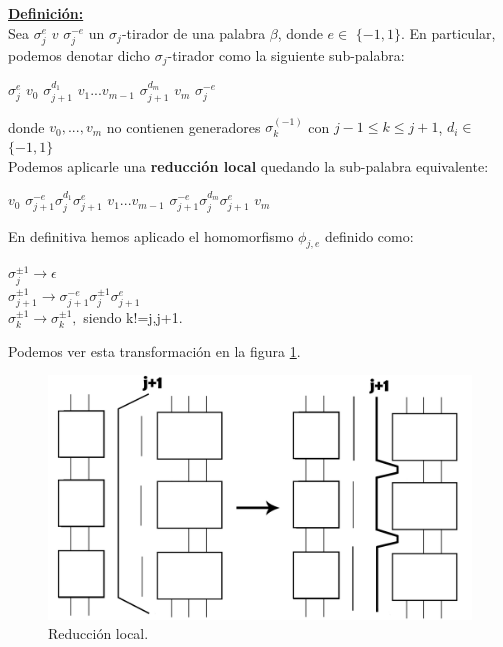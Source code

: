 \underline{\textbf{ Definición:}}\\
Sea $\sigma_{j}^{e}$ $v$ $\sigma_{j}^{-e} $ un $\sigma_{j}$-tirador de una palabra $\beta$, donde $e \in$ $ \{-1,1\} $. En particular, podemos denotar dicho $\sigma_{j}$-tirador como la siguiente sub-palabra:
\begin{center}
	$ \sigma_{j}^{e} $ $ v_{0} $ $\sigma_{j+1}^{d_{1}} $ $ v_{1}...v_{m-1} $ $\sigma_{j+1}^{d_{m}} $ $ v_{m} $ $ \sigma_{j}^{-e} $
\end{center} donde $v_{0},...,v_{m}$ no contienen generadores $\sigma_{k}^{(-1)}$ con $ j-1 \le k \le j+1 $, $d_{i} \in$ $ \{-1,1\} $\\
Podemos aplicarle una \textbf{reducción local} quedando la sub-palabra equivalente:
\begin{center}
 $ v_{0} $ $\sigma_{j+1}^{-e} \sigma_{j}^{d_{1}} \sigma_{j+1}^{e}$ $ v_{1}...v_{m-1} $ $\sigma_{j+1}^{-e} \sigma_{j}^{d_{m}} \sigma_{j+1}^{e}$ $ v_{m} $
\end{center}
En definitiva hemos aplicado el homomorfismo $\phi_{j,e}$ definido como:
\begin{center}
	$\sigma_{j}^{\pm 1} \rightarrow \epsilon$\\
	$\sigma_{j+1}^{\pm 1} \rightarrow \sigma_{j+1}^{-e} \sigma_{j}^{\pm 1} \sigma_{j+1}^{e}$\\
	$\sigma_{k}^{\pm 1} \rightarrow \sigma_{k}^{\pm 1},$ siendo k!=j,j+1.\\
\end{center}

Podemos ver esta transformación en la figura \ref{h3}.\\
\begin{figure}[h!]
	\centering
	\includegraphics[width=14cm]{itrenzas/h14.png}
	\caption{Reducción local.}
	\label{h3} 
\end{figure}

